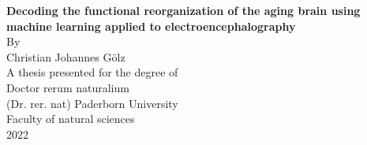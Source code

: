 \begin{titlepage}
    \begin{center}
        \vspace*{1cm}
        \LARGE
        \textbf{Decoding the functional reorganization of the aging brain using machine learning applied to electroencephalography}\\
        \vspace{1.5cm}
        \Large
        By\\
        \vspace{0.5cm}
        Christian Johannes Gölz\\
        \vspace{0.5cm}       
        A thesis presented for the degree of\\
        Doctor rerum naturalium\\
        (Dr. rer. nat)
        \vfill
        \Large
        Paderborn University\\
        Faculty of natural sciences\\
        2022
            
    \end{center}
\end{titlepage}

